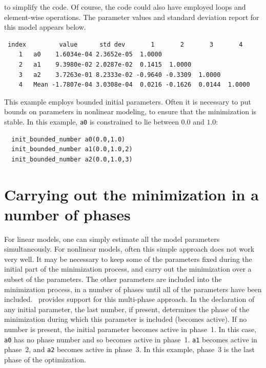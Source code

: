\documentclass{admbmanual}
\begin{document}
to simplify the code. Of course, the code could also have employed
loops and element-wise operations. The parameter values
and standard deviation report for this model appears below. 
\begin{lstlisting}
 index         value      std dev       1       2       3       4   
    1   a0    1.6034e-04 2.3652e-05  1.0000
    2   a1    9.3980e-02 2.0287e-02  0.1415  1.0000
    3   a2    3.7263e-01 8.2333e-02 -0.9640 -0.3309  1.0000
    4   Mean -1.7807e-04 3.0308e-04  0.0216 -0.1626  0.0144  1.0000
\end{lstlisting}
This example employs bounded initial parameters.
Often it is necessary to put bounds on parameters in nonlinear
modeling, to ensure that the minimization is stable.
In this example, \texttt{a0} is constrained to lie between $0.0$ and $1.0$:
\begin{lstlisting}
  init_bounded_number a0(0.0,1.0)
  init_bounded_number a1(0.0,1.0,2)
  init_bounded_number a2(0.0,1.0,3)
\end{lstlisting}


\section{Carrying out the minimization in a number of phases}

For linear models, one can simply estimate all the model parameters
simultaneously. For nonlinear models, often this simple approach does 
not work very well. It may be necessary to keep some of the
parameters fixed during the initial part of the minimization 
process, and carry out the minimization over a subset of the parameters.
The other parameters are included into the minimization
process, in a number of phases until all of the parameters have
been included. \ADM\ provides support for this multi-phase
approach. In the declaration of any initial parameter, the last number,
if present, determines the phase of the minimization 
during which this parameter is included (becomes active). If
no number is present, the initial parameter 
becomes active in phase~1.  
In this case, \texttt{a0} has no phase number and so becomes
active in phase~1. \texttt{a1} becomes active in phase~2, and
\texttt{a2} becomes active in phase~3. In this example,
phase~3 is the last phase of the optimization.
\end{document}
